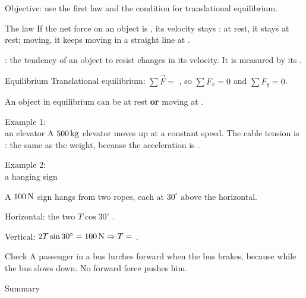 \begin{center}\textsf{\small\color{apgrey}Objective: use the first law and the condition for translational equilibrium.}\end{center}
\begin{nrow}{The law}
If the net force on an object is , its velocity stays : at rest, it stays at rest; moving, it keeps moving in a straight line at .\par
{}: the tendency of an object to resist changes in its velocity. It is measured by its .
\end{nrow}
\begin{nrow}{Equilibrium}
Translational equilibrium: $\sum\vec F=$ , so $\sum F_x=0$ and $\sum F_y=0$.\par
An object in equilibrium can be at rest \textbf{or} moving at .
\end{nrow}
\begin{nrow}{Example 1:\\ an elevator}
A $500\,\mathrm{kg}$ elevator moves up at a constant speed. The cable tension is \fillin{$5000\N$}: the same as the weight, because the acceleration is .
\end{nrow}
\begin{nrow}{Example 2:\\ a hanging sign}
\begin{minipage}[t]{0.58\linewidth}
A $100\N$ sign hangs from two ropes, each at $30^\circ$ above the horizontal.\par
Horizontal: the two $T\cos30^\circ$ .\par
Vertical: $2T\sin30^\circ=100\,\mathrm{N}\Rightarrow T=$ \fillin{$100\N$}.
\end{minipage}\hfill
\begin{minipage}[t]{0.36\linewidth}\vspace{0pt}
\end{minipage}
\end{nrow}
\begin{nrow}{Check}
A passenger in a bus lurches forward when the bus brakes, because  while the bus slows down. No forward force pushes him.
\end{nrow}
\begin{nrow}{Summary}
\else\vspace{2.2cm}\fi
\end{nrow}

